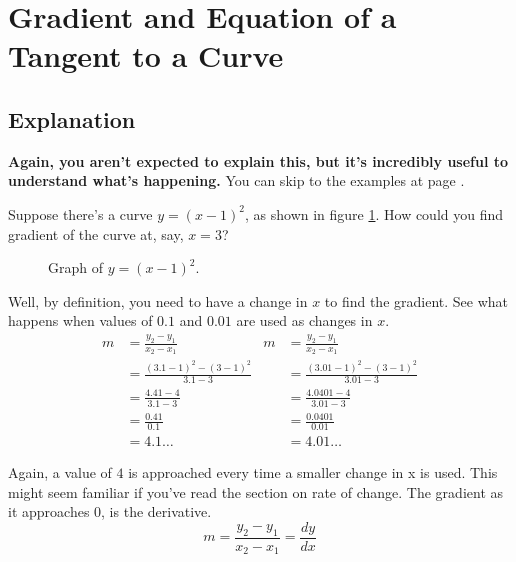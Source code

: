 \section{Gradient and Equation of a Tangent to a Curve}
\subsection{Explanation}
\textbf{Again, you aren't expected to explain this, but it's incredibly useful to understand what's happening.} You can skip to the examples at page \pageref{sec:derivativeExamples}.

Suppose there's a curve $y=(x-1)^2$, as shown in figure \ref{fig:gradientBasicExample}. How could you find gradient of the curve at, say, $x=3$?

\begin{figure}[h!]
	\centering
	\caption{Graph of $y=(x-1)^2$.}
	\label{fig:gradientBasicExample}
\end{figure}

Well, by definition, you need to have a change in $x$ to find the gradient. See what happens when values of $0.1$ and $0.01$ are used as changes in $x$.
\begin{align*}
	m &= \frac{y_2 - y_1}{x_2 - x_1} & m &= \frac{y_2 - y_1}{x_2 - x_1}\\
	&= \frac{(3.1-1)^2 - (3-1)^2}{3.1-3} & &= \frac{(3.01-1)^2 - (3-1)^2}{3.01-3}\\
	&= \frac{4.41 - 4}{3.1-3} & &= \frac{4.0401 - 4}{3.01-3}\\
	&= \frac{0.41}{0.1} & &= \frac{0.0401}{0.01}\\
	&= 4.1\dots & &= 4.01\dots
\end{align*}

Again, a value of $4$ is approached every time a smaller change in x is used. This might seem familiar if you've read the section on rate of change. The gradient as it approaches $0$, is the derivative.
\begin{equation*}
	m = \frac{y_2 - y_1}{x_2 - x_1} = \frac{dy}{dx}
\end{equation*}

